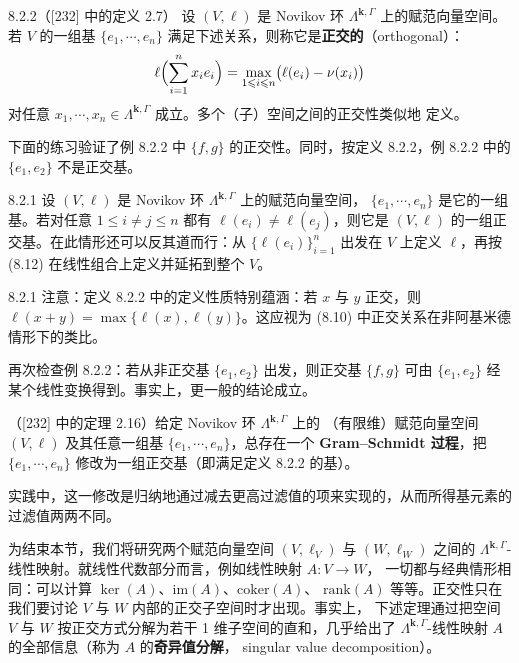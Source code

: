 \begin{wdefn}{8.2.2}（[232] 中的定义 2.7）
  设 $(V,\ell)$ 是 Novikov 环 $\Lambda^{\mathbf{k},\Gamma}$ 上的赋范向量空间。若 $V$ 的一组基
  $\{e_1,\cdots,e_n\}$ 满足下述关系，则称它是\textbf{正交的}（orthogonal）：
  \[
    \ell\Bigl(\sum_{i=1}^n x_ie_i\Bigr)
      =\max_{1\leqslant i\leqslant n}\bigl(\ell(e_i)-\nu(x_i)\bigr)
  \]
  对任意 $x_1,\cdots,x_n\in\Lambda^{\mathbf{k},\Gamma}$ 成立。多个（子）空间之间的正交性类似地
  定义。
\end{wdefn}

下面的练习验证了例 8.2.2 中 $\{f,g\}$ 的正交性。同时，按定义 8.2.2，例 8.2.2 中的
$\{e_1,e_2\}$ 不是正交基。

\begin{wexer}{8.2.1}
  设 $(V,\ell)$ 是 Novikov 环 $\Lambda^{\mathbf{k},\Gamma}$ 上的赋范向量空间，
  $\{e_1,\cdots,e_n\}$ 是它的一组基。若对任意 $1\leqslant i\ne j\leqslant n$ 都有
  $\ell(e_i)\ne\ell(e_j)$，则它是 $(V,\ell)$ 的一组正交基。在此情形还可以反其道而行：从
  $\{\ell(e_i)\}_{i=1}^n$ 出发在 $V$ 上定义 $\ell$，再按 (8.12) 在线性组合上定义并延拓到整个
  $V$。
\end{wexer}

\begin{wrem}{8.2.1}
  注意：定义 8.2.2 中的定义性质特别蕴涵：若 $x$ 与 $y$ 正交，则
  $\ell(x+y)=\max\{\ell(x),\ell(y)\}$。这应视为 (8.10) 中正交关系在非阿基米德情形下的类比。
\end{wrem}

再次检查例 8.2.2：若从非正交基 $\{e_1,e_2\}$ 出发，则正交基 $\{f,g\}$ 可由 $\{e_1,e_2\}$ 经
某个线性变换得到。事实上，更一般的结论成立。

（[232] 中的定理 2.16）\quad 给定 Novikov 环 $\Lambda^{\mathbf{k},\Gamma}$ 上的
（有限维）赋范向量空间 $(V,\ell)$ 及其任意一组基 $\{e_1,\cdots,e_n\}$，总存在一个
\textbf{Gram--Schmidt 过程}，把 $\{e_1,\cdots,e_n\}$ 修改为一组正交基（即满足定义 8.2.2 的基）。

实践中，这一修改是归纳地通过减去更高过滤值的项来实现的，从而所得基元素的过滤值两两不同。

为结束本节，我们将研究两个赋范向量空间 $(V,\ell_V)$ 与 $(W,\ell_W)$ 之间的
$\Lambda^{\mathbf{k},\Gamma}$-线性映射。就线性代数部分而言，例如线性映射 $A\colon V\to W$，
一切都与经典情形相同：可以计算 $\ker(A)$、$\mathrm{im}(A)$、$\mathrm{coker}(A)$、
$\mathrm{rank}(A)$ 等等。正交性只在我们要讨论 $V$ 与 $W$ 内部的正交子空间时才出现。事实上，
下述定理通过把空间 $V$ 与 $W$ 按正交方式分解为若干 1 维子空间的直和，几乎给出了
$\Lambda^{\mathbf{k},\Gamma}$-线性映射 $A$ 的全部信息（称为 $A$ 的\textbf{奇异值分解}，
singular value decomposition）。

